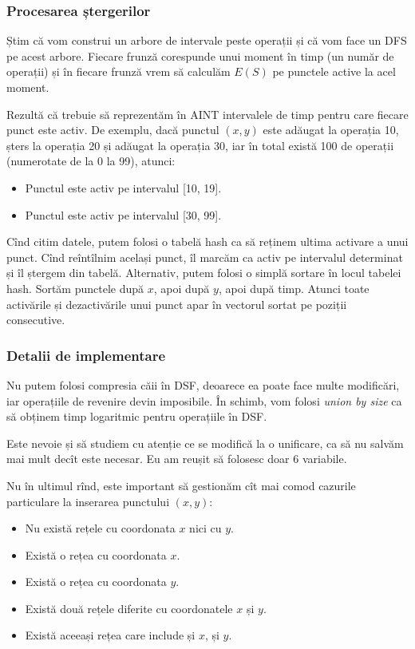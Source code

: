 \documentclass[../main.tex]{subfiles}
\begin{document}
\subsubsection*{Procesarea ștergerilor}

Știm că vom construi un arbore de intervale peste operații și că vom face un DFS pe acest arbore. Fiecare frunză corespunde unui moment în timp (un număr de operații) și în fiecare frunză vrem să calculăm $E(S)$ pe punctele active la acel moment.

Rezultă că trebuie să reprezentăm în AINT intervalele de timp pentru care fiecare punct este activ. De exemplu, dacă punctul $(x,y)$ este adăugat la operația 10, șters la operația 20 și adăugat la operația 30, iar în total există 100 de operații (numerotate de la 0 la 99), atunci:

\begin{itemize}
  \item Punctul este activ pe intervalul [10, 19].
  \item Punctul este activ pe intervalul [30, 99].
\end{itemize}

Cînd citim datele, putem folosi o tabelă hash ca să reținem ultima activare a unui punct. Cînd reîntîlnim același punct, îl marcăm ca activ pe intervalul determinat și îl ștergem din tabelă. Alternativ, putem folosi o simplă sortare în locul tabelei hash. Sortăm punctele după $x$, apoi după $y$, apoi după timp. Atunci toate activările și dezactivările unui punct apar în vectorul sortat pe poziții consecutive.

\subsubsection*{Detalii de implementare}

Nu putem folosi compresia căii în DSF, deoarece ea poate face multe modificări, iar operațiile de revenire devin imposibile. În schimb, vom folosi \textit{union by size} ca să obținem timp logaritmic pentru operațiile în DSF.

Este nevoie și să studiem cu atenție ce se modifică la o unificare, ca să nu salvăm mai mult decît este necesar. Eu am reușit să folosesc doar 6 variabile.

Nu în ultimul rînd, este important să gestionăm cît mai comod cazurile particulare la inserarea punctului $(x, y)$:

\begin{itemize}
  \item Nu există rețele cu coordonata $x$ nici cu $y$.

  \item Există o rețea cu coordonata $x$.

  \item Există o rețea cu coordonata $y$.

  \item Există două rețele diferite cu coordonatele $x$ și $y$.

  \item Există aceeași rețea care include și $x$, și $y$.
\end{itemize}
\end{document}
